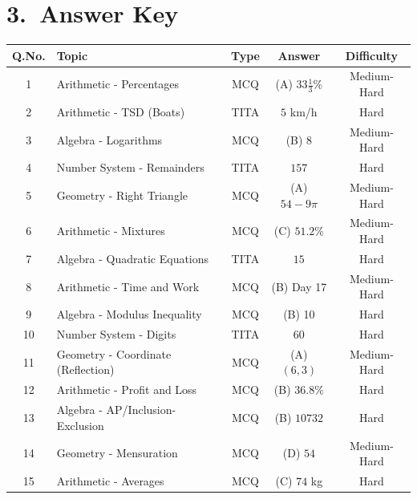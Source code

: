 \documentclass[11pt]{article}
\begin{document}
\newpage
\section*{3.\ Answer Key}

\begin{center}
\begin{tabular}{|c|l|c|c|c|}
\hline
\textbf{Q.No.} & \textbf{Topic} & \textbf{Type} & \textbf{Answer} & \textbf{Difficulty} \\
\hline
1  & Arithmetic - Percentages             & MCQ  & (A) \(33\tfrac{1}{3}\%\)  & Medium-Hard \\ \hline
2  & Arithmetic - TSD (Boats)             & TITA & \(5\) km/h                & Hard \\ \hline
3  & Algebra - Logarithms                 & MCQ  & (B) \(8\)                 & Medium-Hard \\ \hline
4  & Number System - Remainders           & TITA & \(157\)                   & Hard \\ \hline
5  & Geometry - Right Triangle            & MCQ  & (A) \(54-9\pi\)           & Medium-Hard \\ \hline
6  & Arithmetic - Mixtures                & MCQ  & (C) \(51.2\%\)            & Medium-Hard \\ \hline
7  & Algebra - Quadratic Equations        & TITA & \(15\)                    & Hard \\ \hline
8  & Arithmetic - Time and Work           & MCQ  & (B) Day 17                & Medium-Hard \\ \hline
9  & Algebra - Modulus Inequality         & MCQ  & (B) 10                    & Hard \\ \hline
10 & Number System - Digits               & TITA & \(60\)                    & Hard \\ \hline
11 & Geometry - Coordinate (Reflection)   & MCQ  & (A) \((6,3)\)             & Medium-Hard \\ \hline
12 & Arithmetic - Profit and Loss         & MCQ  & (B) \(36.8\%\)            & Hard \\ \hline
13 & Algebra - AP/Inclusion-Exclusion     & MCQ  & (B) \(10732\)             & Hard \\ \hline
14 & Geometry - Mensuration               & MCQ  & (D) \(54\)                & Medium-Hard \\ \hline
15 & Arithmetic - Averages                & MCQ  & (C) \(74\) kg             & Hard \\ \hline
\end{tabular}
\end{center}
\end{document}
